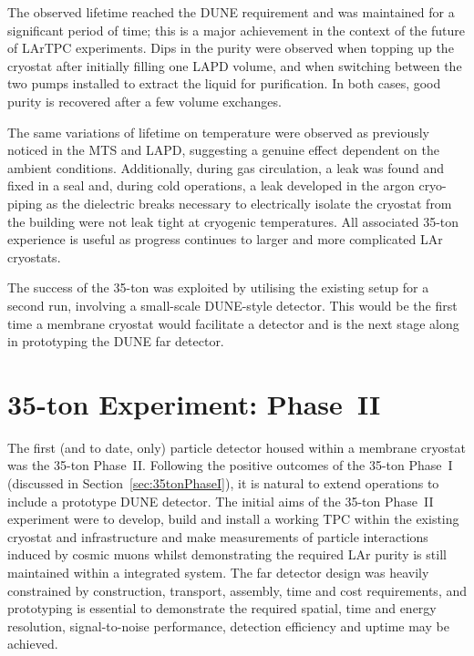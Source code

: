 The observed lifetime reached the DUNE requirement and was maintained for a significant period of time; this is a major achievement in the context of the future of LArTPC experiments.  Dips in the purity were observed when topping up the cryostat after initially filling one LAPD volume, and when switching between the two pumps installed to extract the liquid for purification.  In both cases, good purity is recovered after a few volume exchanges.

The same variations of lifetime on temperature were observed as previously noticed in the MTS and LAPD, suggesting a genuine effect dependent on the ambient conditions.  Additionally, during gas circulation, a leak was found and fixed in a seal and, during cold operations, a leak developed in the argon cryo-piping as the dielectric breaks necessary to electrically isolate the cryostat from the building were not leak tight at cryogenic temperatures.  All associated 35-ton experience is useful as progress continues to larger and more complicated LAr cryostats.

The success of the 35-ton was exploited by utilising the existing setup for a second run, involving a small-scale DUNE-style detector.  This would be the first time a membrane cryostat would facilitate a detector and is the next stage along in prototyping the DUNE far detector.

\section{35-ton Experiment: Phase~II}\label{sec:35tonPhaseII}

The first (and to date, only) particle detector housed within a membrane cryostat was the 35-ton Phase~II.  Following the positive outcomes of the 35-ton Phase~I (discussed in Section~\ref{sec:35tonPhaseI}), it is natural to extend operations to include a prototype DUNE detector.  The initial aims of the 35-ton Phase~II experiment were to develop, build and install a working TPC within the existing cryostat and infrastructure and make measurements of particle interactions induced by cosmic muons whilst demonstrating the required LAr purity is still maintained within a integrated system.  The far detector design was heavily constrained by construction, transport, assembly, time and cost requirements, and prototyping is essential to demonstrate the required spatial, time and energy resolution, signal-to-noise performance, detection efficiency and uptime may be achieved.

